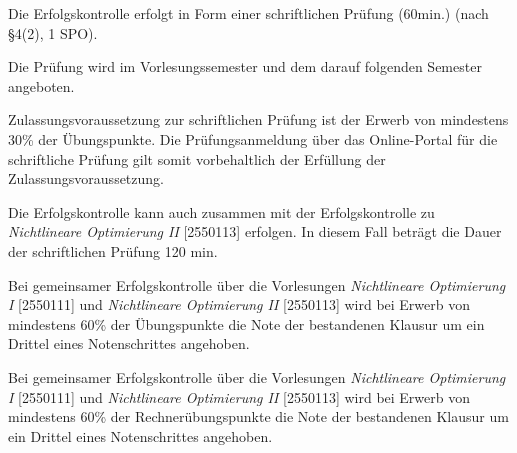 \begin{course}

\setdoclanguagegerman
{}



\coursehead


\label{cour_7885.dp_997}


\begin{styleenv}
\begin{assessment}
Die Erfolgskontrolle erfolgt in Form einer schriftlichen Prüfung (60min.) (nach §4(2), 1 SPO).

 

Die Prüfung wird im Vorlesungssemester und dem darauf folgenden Semester angeboten.

 

Zulassungsvoraussetzung zur schriftlichen Prüfung ist der Erwerb von mindestens 30\% der Übungspunkte. Die Prüfungsanmeldung über das Online-Portal für die schriftliche Prüfung gilt somit vorbehaltlich der Erfüllung der Zulassungsvoraussetzung.

 

Die Erfolgskontrolle kann auch zusammen mit der Erfolgskontrolle zu \emph{Nichtlineare Optimierung II} [2550113] erfolgen. In diesem Fall beträgt die Dauer der schriftlichen Prüfung 120 min.

 

Bei gemeinsamer Erfolgskontrolle über die Vorlesungen \emph{Nichtlineare Optimierung I} [2550111] und \emph{Nichtlineare Optimierung II} [2550113] wird bei Erwerb von mindestens 60\% der Übungspunkte die Note der bestandenen Klausur um ein Drittel eines Notenschrittes angehoben.

 

Bei gemeinsamer Erfolgskontrolle über die Vorlesungen \emph{Nichtlineare Optimierung I} [2550111] und \emph{Nichtlineare Optimierung II} [2550113] wird bei Erwerb von mindestens 60\% der Rechnerübungspunkte die Note der bestandenen Klausur um ein Drittel eines Notenschrittes angehoben.



\end{assessment}
\end{styleenv}
\end{course}

